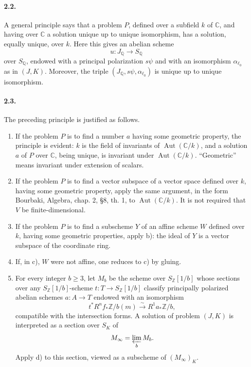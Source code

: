 \documentclass[10pt]{article}
\newcommand{\C}{\mathbb C}
\newcommand{\Q}{\mathbb Q}
\newcommand{\Z}{\mathbb Z}
\newcommand{\Aut}{\operatorname{Aut}}
\newcommand{\iso}{\xrightarrow{\sim}}
\begin{document}
\paragraph{2.2.} A general principle says that a problem \(P\), defined over a subfield \(k\) of \(\C\), and having over \(\C\) a solution unique up to unique isomorphism, has a solution, equally unique, over \(k\). Here this gives an abelian scheme
\[
u:J_\Q\to S_\Q
\]
over \(S_\Q\), endowed with a principal polarization \(s\psi\) and with an isomorphism \(\alpha_{\ell_0}\) as in \((J,K)\). Moreover, the triple \((J_\Q,s\psi,\alpha_{\ell_0})\) is unique up to unique isomorphism.

\paragraph{2.3.} The preceding principle is justified as follows.
\begin{enumerate}[label=\alph*)]
\item If the problem \(P\) is to find a number \(a\) having some geometric property, the principle is evident: \(k\) is the field of invariants of \(\Aut(\C/k)\), and a solution \(a\) of \(P\) over \(\C\), being unique, is invariant under \(\Aut(\C/k)\). ``Geometric'' means invariant under extension of scalars.
\item If the problem \(P\) is to find a vector subspace of a vector space defined over \(k\), having some geometric property, apply the same argument, in the form Bourbaki, Algebra, chap. 2, §8, th. 1, to \(\Aut(\C/k)\). It is not required that \(V\) be finite-dimensional.
\item If the problem \(P\) is to find a subscheme \(Y\) of an affine scheme \(W\) defined over \(k\), having some geometric properties, apply b): the ideal of \(Y\) is a vector subspace of the coordinate ring.
\item If, in c), \(W\) were not affine, one reduces to c) by gluing.
\item For every integer \(b\ge3\), let \(M_b\) be the scheme over \(S_\Z[1/b]\) whose sections over any \(S_\Z[1/b]\)-scheme \(t:T\to S_\Z[1/b]\) classify principally polarized abelian schemes \(a:A\to T\) endowed with an isomorphism
\[
t^*R^nf_*\Z/b(m)\iso R^1a_*\Z/b,
\]
compatible with the intersection forms. A solution of problem \((J,K)\) is interpreted as a section over \(S_K\) of
\[
M_\infty=\varprojlim_b M_b.
\]
Apply d) to this section, viewed as a subscheme of \((M_\infty)_K\).
\end{enumerate}
\end{document}
